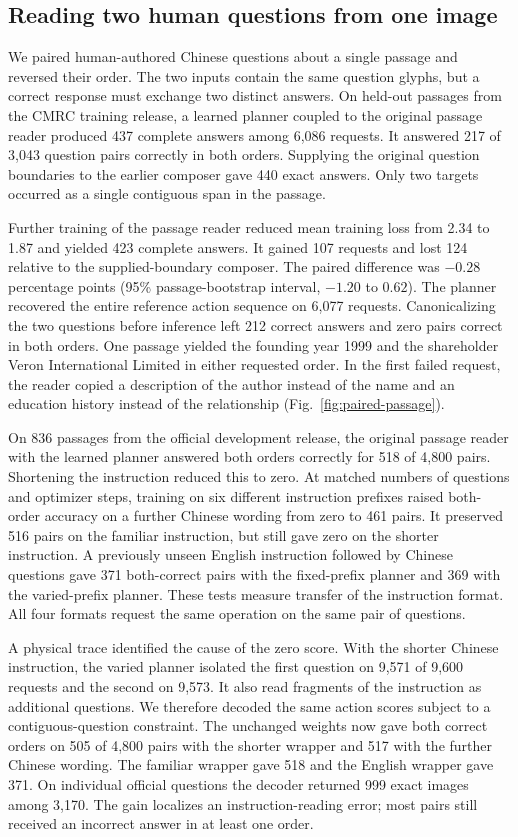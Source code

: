 \subsection*{Reading two human questions from one image}
We paired human-authored Chinese questions about a single passage and reversed their order. The two inputs contain the same question glyphs, but a correct response must exchange two distinct answers. On held-out passages from the CMRC training release, a learned planner coupled to the original passage reader produced 437 complete answers among 6,086 requests. It answered 217 of 3,043 question pairs correctly in both orders. Supplying the original question boundaries to the earlier composer gave 440 exact answers. Only two targets occurred as a single contiguous span in the passage.

Further training of the passage reader reduced mean training loss from 2.34 to 1.87 and yielded 423 complete answers. It gained 107 requests and lost 124 relative to the supplied-boundary composer. The paired difference was $-0.28$ percentage points (95\% passage-bootstrap interval, $-1.20$ to $0.62$). The planner recovered the entire reference action sequence on 6,077 requests. Canonicalizing the two questions before inference left 212 correct answers and zero pairs correct in both orders. One passage yielded the founding year 1999 and the shareholder Veron International Limited in either requested order. In the first failed request, the reader copied a description of the author instead of the name and an education history instead of the relationship (Fig.~\ref{fig:paired-passage}).

On 836 passages from the official development release, the original passage reader with the learned planner answered both orders correctly for 518 of 4,800 pairs. Shortening the instruction reduced this to zero. At matched numbers of questions and optimizer steps, training on six different instruction prefixes raised both-order accuracy on a further Chinese wording from zero to 461 pairs. It preserved 516 pairs on the familiar instruction, but still gave zero on the shorter instruction. A previously unseen English instruction followed by Chinese questions gave 371 both-correct pairs with the fixed-prefix planner and 369 with the varied-prefix planner. These tests measure transfer of the instruction format. All four formats request the same operation on the same pair of questions.

A physical trace identified the cause of the zero score. With the shorter Chinese instruction, the varied planner isolated the first question on 9,571 of 9,600 requests and the second on 9,573. It also read fragments of the instruction as additional questions. We therefore decoded the same action scores subject to a contiguous-question constraint. The unchanged weights now gave both correct orders on 505 of 4,800 pairs with the shorter wrapper and 517 with the further Chinese wording. The familiar wrapper gave 518 and the English wrapper gave 371. On individual official questions the decoder returned 999 exact images among 3,170. The gain localizes an instruction-reading error; most pairs still received an incorrect answer in at least one order.
